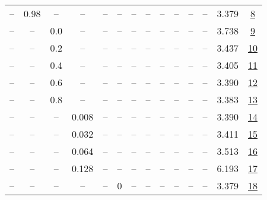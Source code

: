 \begin{table}[H]
\begin{tabular}{cccccccccccccc}
-- & 0.98 & -- & -- & -- & -- & -- & -- & -- & -- & -- & -- & 3.379 & \href{https://wandb.ai/stanford-mercury/optimizer-scaling/runs/sweep-130m-5B-scion277086lr0.016-wd0.1-minlr0-warmup0-b10.98-gn1-5c8c93}{8} \\
-- & -- & 0.0 & -- & -- & -- & -- & -- & -- & -- & -- & -- & 3.738 & \href{https://wandb.ai/stanford-mercury/optimizer-scaling/runs/sweep-130m-5B-scion8f987elr0.016-wd0.1-minlr0-warmup0-b10.95-gn1-0549f7}{9} \\
-- & -- & 0.2 & -- & -- & -- & -- & -- & -- & -- & -- & -- & 3.437 & \href{https://wandb.ai/stanford-mercury/optimizer-scaling/runs/sweep-130m-5B-scionf8ad83lr0.016-wd0.1-minlr0-warmup0-b10.95-gn1-90f661}{10} \\
-- & -- & 0.4 & -- & -- & -- & -- & -- & -- & -- & -- & -- & 3.405 & \href{https://wandb.ai/stanford-mercury/optimizer-scaling/runs/sweep-130m-5B-scioncc0a59lr0.016-wd0.1-minlr0-warmup0-b10.95-gn1-8a6246}{11} \\
-- & -- & 0.6 & -- & -- & -- & -- & -- & -- & -- & -- & -- & 3.390 & \href{https://wandb.ai/stanford-mercury/optimizer-scaling/runs/sweep-130m-5B-scion621619lr0.016-wd0.1-minlr0-warmup0-b10.95-gn1-ef5db1}{12} \\
-- & -- & 0.8 & -- & -- & -- & -- & -- & -- & -- & -- & -- & 3.383 & \href{https://wandb.ai/stanford-mercury/optimizer-scaling/runs/sweep-130m-5B-sciona94de7lr0.016-wd0.1-minlr0-warmup0-b10.95-gn1-cd15b5}{13} \\
-- & -- & -- & 0.008 & -- & -- & -- & -- & -- & -- & -- & -- & 3.390 & \href{https://wandb.ai/stanford-mercury/optimizer-scaling/runs/sweep-130m-5B-scion2dd269lr0.008-wd0.1-minlr0-warmup0-b10.95-gn1-d01816}{14} \\
-- & -- & -- & 0.032 & -- & -- & -- & -- & -- & -- & -- & -- & 3.411 & \href{https://wandb.ai/stanford-mercury/optimizer-scaling/runs/sweep-130m-5B-scion488fa3lr0.032-wd0.1-minlr0-warmup0-b10.95-gn1-e85b67}{15} \\
-- & -- & -- & 0.064 & -- & -- & -- & -- & -- & -- & -- & -- & 3.513 & \href{https://wandb.ai/stanford-mercury/optimizer-scaling/runs/sweep-130m-5B-scion540487lr0.064-wd0.1-minlr0-warmup0-b10.95-gn1-e6f899}{16} \\
-- & -- & -- & 0.128 & -- & -- & -- & -- & -- & -- & -- & -- & 6.193 & \href{https://wandb.ai/stanford-mercury/optimizer-scaling/runs/sweep-130m-5B-scion90c680lr0.128-wd0.1-minlr0-warmup0-b10.95-gn1-5c8212}{17} \\
-- & -- & -- & -- & -- & 0 & -- & -- & -- & -- & -- & -- & 3.379 & \href{https://wandb.ai/stanford-mercury/optimizer-scaling/runs/sweep-130m-5B-scione5e910lr0.016-wd0.1-minlr0-warmup0-b10.95-gn0-7a05f3}{18} \\

\end{tabular}
\end{table}
